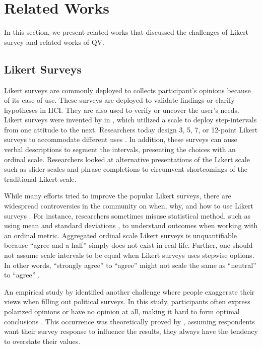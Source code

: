 \section{Related Works} \label{related_works}
In this section, 
we present related works
that discussed the challenges
of Likert survey
and related works of QV.

\subsection{Likert Surveys}
Likert surveys are commonly deployed
to collects participant's opinions
because of its ease of use.
These surveys are deployed
to validate findings or clarify hypotheses
\cite{ozok2009survey, ledo2018evaluation} in HCI.
They are also used to verify or uncover the user's needs.
Likert surveys were invented by \textcite{likert1932technique} 
in \citeyear{likert1932technique},
which utilized a scale to deploy step-intervals 
from one attitude to the next.
Researchers today design 3, 5, 7, 
or 12-point Likert surveys to accommodate different uses
\cite{garland2008computer,finstad2010}.
In addition, these surveys
can ause verbal descriptions
to segment the intervals,
presenting the choices with an ordinal scale.
Researchers looked at
alternative presentations of the Likert scale
such as slider scales \cite{roster2015exploring} 
and phrase completions \cite{hodge2003phrase}
to circumvent shortcomings of the traditional Likert scale.

While many efforts tried to
improve the popular Likert surveys,
there are widespread controversies in the community on
when, why, and how to use Likert surveys \cite{bishop2015use}.
For instance, 
researchers sometimes misuse statistical method,
such as using mean and standard deviations \cite{jamieson2004likert},
to understand outcomes
when working with an ordinal metric.
Aggregated ordinal scale Likert surveys is 
unquantifiable because ``agree and a half'' 
simply does not exist in real life.
Further, 
one should not assume scale intervals to be equal
when Likert surveys uses stepwise options.
In other words,
``strongly agree'' to ``agree''
might not scale the same as 
``neutral'' to ``agree'' 
\cite{jamieson2004likert, edmondson2005likert}.

An empirical study by \textcite{quarfoot2017quadratic}
identified another challenge
where people exaggerate their views
when filling out political surveys.
In this study,
participants often express polarized opinions
or have no opinion at all,
making it hard to form optimal conclusions \cite{posner2018radical}.
This occurrence was 
theoretically proved by \textcite{cavaille2018towards},
assuming respondents want their survey response
to influence the results,
they always have the tendency to overstate their values.

